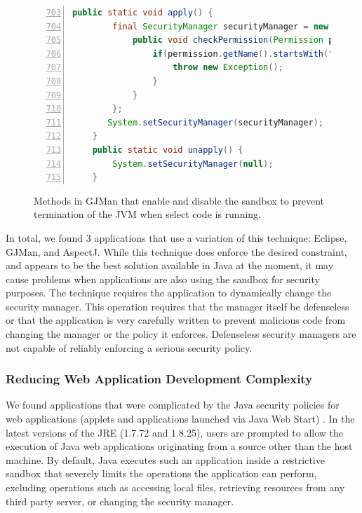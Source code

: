 \documentclass{sig-alternate}
\begin{document}
\begin{figure}
\begin{lstlisting}[language=Java,numbers=left,basicstyle={\scriptsize},breaklines=true,firstnumber=703,xrightmargin={0.1cm},numbersep={-10pt}]
    public static void apply() { 
        final SecurityManager securityManager = new SecurityManager() { 
            public void checkPermission(Permission permission) { 
                if(permission.getName().startsWith("exitVM")) { 
                    throw new Exception(); 
                } 
            } 
        }; 
       System.setSecurityManager(securityManager); 
    }
    public static void unapply() { 
        System.setSecurityManager(null); 
    }
\end{lstlisting}


\caption{Methods in GJMan that enable and disable the sandbox to prevent termination
of the JVM when select code is running.}
\label{fig:GJMan-snippet}
\end{figure}


In total, we found 3 applications that use a variation of this technique:
Eclipse, GJMan, and AspectJ. While this technique does enforce the
desired constraint, and appears to be the best solution available
in Java at the moment, it may cause problems when applications are
also using the sandbox for security purposes. The technique requires
the application to dynamically change the security manager. This operation
requires that the manager itself be defenseless or that the application
is very carefully written to prevent malicious code from changing
the manager or the policy it enforces. Defenseless security managers
are not capable of reliably enforcing a serious security policy.


\subsubsection{Reducing Web Application Development Complexity}\label{sub:Reducing-Web-Application-Complexity}

We found applications that were complicated by the Java security policies
for web applications (applets and applications launched via Java Web
Start) \cite{_java_web_start}. In the latest versions of the JRE
(1.7.72 and 1.8.25), users are prompted to allow the execution of
Java web applications originating from a source other than the host
machine. By default, Java executes such an application inside a restrictive
sandbox that severely limits the operations the application can perform,
excluding operations such as accessing local files, retrieving resources
from any third party server, or changing the security manager. 
\end{document}
